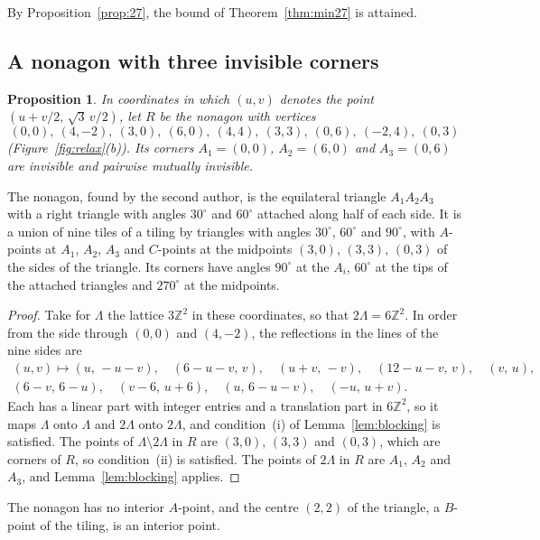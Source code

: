 \documentclass[11pt,a4paper]{article}
\theoremstyle{plain}
\newtheorem{proposition}[theorem]{Proposition}
\theoremstyle{definition}
\theoremstyle{remark}
\newcommand{\Z}{\mathbb{Z}}
\newcommand{\dg}{^\circ}
\numberwithin{equation}{section}
\begin{document}
By Proposition~\ref{prop:27}, the bound of Theorem~\ref{thm:min27} is attained.

\subsection{A nonagon with three invisible corners}
\begin{proposition}\label{prop:nonagon}
In coordinates in which $(u,v)$ denotes the point $(u+v/2,\,\sqrt3\,v/2)$, let $R$ be the nonagon with vertices
\[
(0,0),\ (4,-2),\ (3,0),\ (6,0),\ (4,4),\ (3,3),\ (0,6),\ (-2,4),\ (0,3)
\]
\textup{(}Figure~\textup{\ref{fig:relax}(b))}. Its corners $A_1=(0,0)$, $A_2=(6,0)$ and $A_3=(0,6)$ are invisible and pairwise mutually invisible.
\end{proposition}

The nonagon, found by the second author, is the equilateral triangle $A_1A_2A_3$ with a right triangle with angles $30\dg$ and $60\dg$ attached along half of each side. It is a union of nine tiles of a tiling by triangles with angles $30\dg$, $60\dg$ and $90\dg$, with $A$-points at $A_1$, $A_2$, $A_3$ and $C$-points at the midpoints $(3,0)$, $(3,3)$, $(0,3)$ of the sides of the triangle. Its corners have angles $90\dg$ at the $A_i$, $60\dg$ at the tips of the attached triangles and $270\dg$ at the midpoints.

\begin{proof}
Take for $\Lambda$ the lattice $3\Z^2$ in these coordinates, so that $2\Lambda=6\Z^2$. In order from the side through $(0,0)$ and $(4,-2)$, the reflections in the lines of the nine sides are
\begin{gather*}
(u,v)\mapsto(u,\,-u-v),\quad(6-u-v,\,v),\quad(u+v,\,-v),\quad(12-u-v,\,v),\quad(v,\,u),\\
(6-v,\,6-u),\quad(v-6,\,u+6),\quad(u,\,6-u-v),\quad(-u,\,u+v).
\end{gather*}
Each has a linear part with integer entries and a translation part in $6\Z^2$, so it maps $\Lambda$ onto $\Lambda$ and $2\Lambda$ onto $2\Lambda$, and condition~(i) of Lemma~\ref{lem:blocking} is satisfied. The points of $\Lambda\setminus2\Lambda$ in $R$ are $(3,0)$, $(3,3)$ and $(0,3)$, which are corners of $R$, so condition~(ii) is satisfied. The points of $2\Lambda$ in $R$ are $A_1$, $A_2$ and $A_3$, and Lemma~\ref{lem:blocking} applies.
\end{proof}

The nonagon has no interior $A$-point, and the centre $(2,2)$ of the triangle, a $B$-point of the tiling, is an interior point.
\end{document}
